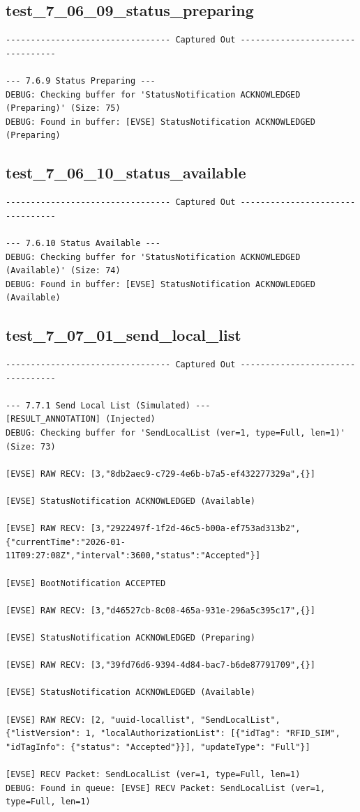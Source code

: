 \documentclass{article}
\begin{document}
\subsection*{test\_7\_06\_09\_status\_preparing}
\begin{lstlisting}
--------------------------------- Captured Out ---------------------------------

--- 7.6.9 Status Preparing ---
DEBUG: Checking buffer for 'StatusNotification ACKNOWLEDGED (Preparing)' (Size: 75)
DEBUG: Found in buffer: [EVSE] StatusNotification ACKNOWLEDGED (Preparing)
\end{lstlisting}
\subsection*{test\_7\_06\_10\_status\_available}
\begin{lstlisting}
--------------------------------- Captured Out ---------------------------------

--- 7.6.10 Status Available ---
DEBUG: Checking buffer for 'StatusNotification ACKNOWLEDGED (Available)' (Size: 74)
DEBUG: Found in buffer: [EVSE] StatusNotification ACKNOWLEDGED (Available)
\end{lstlisting}
\subsection*{test\_7\_07\_01\_send\_local\_list}
\begin{lstlisting}
--------------------------------- Captured Out ---------------------------------

--- 7.7.1 Send Local List (Simulated) ---
[RESULT_ANNOTATION] (Injected)
DEBUG: Checking buffer for 'SendLocalList (ver=1, type=Full, len=1)' (Size: 73)

[EVSE] RAW RECV: [3,"8db2aec9-c729-4e6b-b7a5-ef432277329a",{}]

[EVSE] StatusNotification ACKNOWLEDGED (Available)

[EVSE] RAW RECV: [3,"2922497f-1f2d-46c5-b00a-ef753ad313b2",{"currentTime":"2026-01-11T09:27:08Z","interval":3600,"status":"Accepted"}]

[EVSE] BootNotification ACCEPTED

[EVSE] RAW RECV: [3,"d46527cb-8c08-465a-931e-296a5c395c17",{}]

[EVSE] StatusNotification ACKNOWLEDGED (Preparing)

[EVSE] RAW RECV: [3,"39fd76d6-9394-4d84-bac7-b6de87791709",{}]

[EVSE] StatusNotification ACKNOWLEDGED (Available)

[EVSE] RAW RECV: [2, "uuid-locallist", "SendLocalList", {"listVersion": 1, "localAuthorizationList": [{"idTag": "RFID_SIM", "idTagInfo": {"status": "Accepted"}}], "updateType": "Full"}]

[EVSE] RECV Packet: SendLocalList (ver=1, type=Full, len=1)
DEBUG: Found in queue: [EVSE] RECV Packet: SendLocalList (ver=1, type=Full, len=1)
\end{lstlisting}
\end{document}
